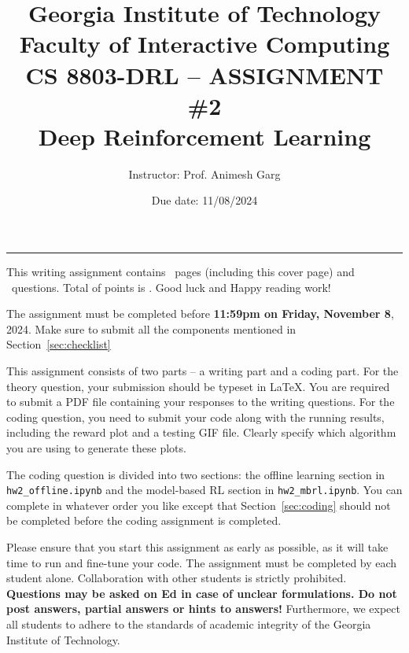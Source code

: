 \documentclass[letterpaper,12pt,addpoints]{exam}
\newcommand{\university}{Georgia Institute of Technology}
\newcommand{\faculty}{Faculty of Interactive Computing}
\newcommand{\class}{CS 8803-DRL }
\newcommand{\examnum}{ASSIGNMENT \#2}
\newcommand{\content}{Deep Reinforcement Learning}
\newcommand{\examdate}{11/08/2024}
\begin{document}
\title{\Large \textbf{\university\\ \faculty\\
\bigskip
\class -- \examnum \\ \content}}
\author{Instructor: Prof. Animesh Garg}
\date{Due date: \examdate}

\maketitle
\begin{flushleft}
\medskip

\end{flushleft}
\noindent

\rule{\textwidth}{1pt}

\noindent This writing assignment contains \numpages\ pages (including this cover page) and \numquestions\ questions. Total of points is \numpoints. Good luck and Happy reading work!

\vspace{15pt}

The assignment must be completed before \textbf{11:59pm on Friday, November 8}, 2024.  Make sure to submit all the components mentioned in Section~\ref{sec:checklist}

This assignment consists of two parts -- a writing part and a coding part. For the theory question, your submission should be typeset in \LaTeX. You are required to submit a PDF file containing your responses to the writing questions. For the coding question, you need to submit your code along with the running results, including the reward plot and a testing GIF file. Clearly specify which algorithm you are using to generate these plots. 

The coding question is divided into two sections: the offline learning section in \texttt{hw2\_offline.ipynb} and the model-based RL section in \texttt{hw2\_mbrl.ipynb}. You can complete in whatever order you like except that Section~\ref{sec:coding} should not be completed before the coding assignment is completed.

Please ensure that you start this assignment as early as possible, as it will take time to run and fine-tune your code. The assignment must be completed by each student alone. Collaboration with other students is strictly prohibited. \textbf{Questions may be asked on Ed in case of unclear formulations. Do not post answers, partial answers or hints to answers!} Furthermore, we expect all students to adhere to the standards of academic integrity of the Georgia Institute of Technology.
\end{document}
